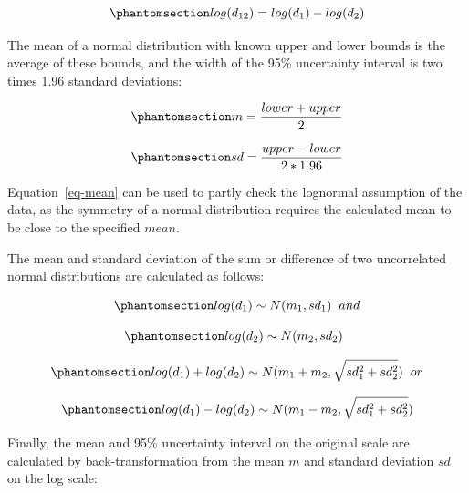 \documentclass[
  letterpaper,
  DIV=11,
  numbers=noendperiod]{scrartcl}
\begin{document}
\begin{equation}\phantomsection\label{eq-logdivide}{
log(d_{12})=log(d_1) - log(d_2)
}\end{equation}

The mean of a normal distribution with known upper and lower bounds is
the average of these bounds, and the width of the 95\% uncertainty
interval is two times 1.96 standard deviations:

\begin{equation}\phantomsection\label{eq-mean}{
m=\frac{lower + upper}{2}
}\end{equation}

\begin{equation}\phantomsection\label{eq-sd}{
sd=\frac{upper - lower}{2 * 1.96}
}\end{equation}

Equation~\ref{eq-mean} can be used to partly check the lognormal
assumption of the data, as the symmetry of a normal distribution
requires the calculated mean to be close to the specified \(mean\).

The mean and standard deviation of the sum or difference of two
uncorrelated normal distributions are calculated as follows:

\begin{equation}\phantomsection\label{eq-lognormal1}{
log(d_1) \sim N(m_1, sd_1) \hspace{.2 cm} and
}\end{equation}

\begin{equation}\phantomsection\label{eq-lognormal2}{
log(d_2) \sim N(m_2, sd_2) \hspace{.2 cm}
}\end{equation}

\begin{equation}\phantomsection\label{eq-lognormalmultiply}{
log(d_1) + log(d_2) \sim N(m_1 + m_2,  \sqrt{sd_1^2 + sd_2^2}) \hspace{.2 cm} or
}\end{equation}

\begin{equation}\phantomsection\label{eq-lognormaldivide}{
log(d_1) - log(d_2) \sim N(m_1 - m_2,  \sqrt{sd_1^2 + sd_2^2})
}\end{equation}

Finally, the mean and 95\% uncertainty interval on the original scale
are calculated by back-transformation from the mean \(m\) and standard
deviation \(sd\) on the log scale:
\end{document}
